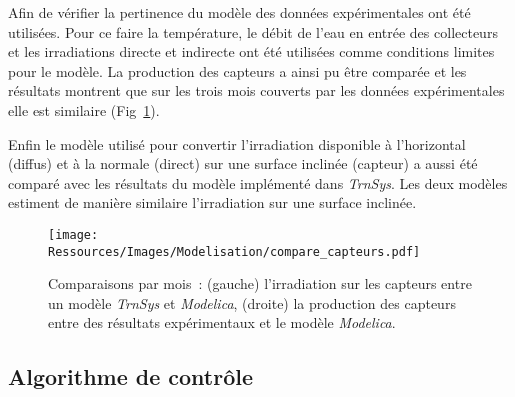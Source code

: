Afin de vérifier la pertinence du modèle des données expérimentales ont été utilisées.
Pour ce faire la température, le débit de l’eau en entrée des collecteurs et les
irradiations directe et indirecte ont été utilisées comme conditions limites pour le
modèle. La production des capteurs a ainsi pu être comparée et les résultats montrent que
sur les trois mois couverts par les données expérimentales elle est similaire
(Fig~\ref{fig:compare_capteurs}).

Enfin le modèle utilisé pour convertir l’irradiation disponible à l’horizontal (diffus)
et à la normale (direct) sur une surface inclinée (capteur) a aussi été comparé
avec les résultats du modèle implémenté dans \emph{TrnSys}. Les deux
modèles estiment de manière similaire l’irradiation sur une surface inclinée.

\begin{figure}
    \begin{center}
        \texttt{[image: Ressources/Images/Modelisation/compare\_capteurs.pdf]}
    \end{center}
    \caption{Comparaisons par mois~: (gauche) l’irradiation sur les capteurs entre un modèle
             \emph{TrnSys} et \emph{Modelica}, (droite) la production des capteurs entre des résultats
             expérimentaux et le modèle \emph{Modelica}.
             \label{fig:compare_capteurs}}
\end{figure}


\subsection{Algorithme de contrôle} %
\label{sub:algorithme_de_controle}
